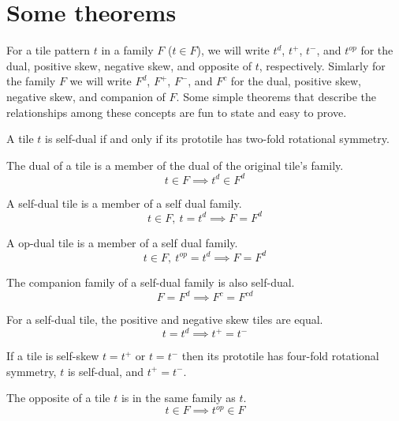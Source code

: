 \documentclass{tufte-book}
\begin{document}
\section{Some theorems}

\noindent
For a tile pattern $t$ in a family $F$ ($t\in F$), we will write $t^d$, $t^+$, $t^-$, and  $t^{op}$ for the dual, positive skew, negative skew, and opposite of $t$, respectively. Simlarly for the family $F$ we will write $F^d$, $F^+$, $F^-$, and  $F^{c}$ for the dual, positive skew, negative skew, and companion of $F$. Some simple theorems that describe the relationships among these concepts are fun to state and easy to prove.

\begin{theorem}
A tile $t$ is self-dual if and only if its prototile has two-fold rotational symmetry.      
\end{theorem}

\begin{theorem}
The dual of a tile is a member of the dual of the original tile's family.
$$t\in F \implies t^d \in F^d$$  
\end{theorem}

\begin{theorem}
A self-dual tile is a member of a self dual family. 
$$t\in F, \: t=t^d \implies F = F^d$$     
\end{theorem}

\begin{theorem}
A op-dual tile is a member of a self dual family.  
$$t\in F, \: t^{op}=t^d \implies F = F^d$$     
\end{theorem}

\begin{theorem}
The companion family of a self-dual family is also self-dual.  
$$F = F^d \implies F^c = F^{cd}$$     
\end{theorem}

\begin{theorem}
For a self-dual tile, the positive and negative skew tiles are equal. 
$$t = t^d \implies t^+ = t^-$$
\end{theorem}

\begin{theorem}
If a tile is self-skew $t=t^+$ or $t=t^-$ then its prototile has four-fold rotational symmetry, $t$ is self-dual, and $t^+ = t^-$. 
\end{theorem}

\begin{theorem}
The opposite of a tile $t$ is in the same family as $t$. 
$$t\in F \implies t^{op} \in F$$
\end{theorem}
\end{document}
